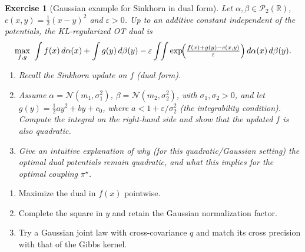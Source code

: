 \documentclass[11pt,a4paper]{article}
\theoremstyle{exostyle}
\newtheorem{exercise}{Exercise}
\begin{document}
\begin{exercise}[Gaussian example for Sinkhorn in dual form]\label{ex:gaussian-sinkhorn}
Let $\alpha,\beta\in\mathcal P_2(\mathbb R)$, $c(x,y)=\frac12(x-y)^2$
and $\varepsilon>0$. Up to an additive constant independent of the
potentials, the KL-regularized OT dual is
\[
\max_{f,g} \ \int f(x)\,d\alpha(x) + \int g(y)\,d\beta(y)
- \varepsilon \int\!\!\int \exp\!\Bigl(\tfrac{f(x)+g(y)-c(x,y)}{\varepsilon}\Bigr)\,d\alpha(x)\,d\beta(y).
\]
\begin{enumerate}[label=\textbf{(\arabic*)}]
  \item Recall the Sinkhorn update on $f$ (dual form).
  \item Assume $\alpha=\mathcal N(m_1,\sigma_1^2)$, $\beta=\mathcal N(m_2,\sigma_2^2)$, with $\sigma_1,\sigma_2>0$, and let $g(y)=\frac12 a y^2+b y+c_0$, where $a<1+\varepsilon/\sigma_2^2$ (the integrability condition). Compute the integral on the right-hand side and show that the updated $f$ is also quadratic.
  \item Give an intuitive explanation of why (for this quadratic/Gaussian setting) the optimal dual potentials remain quadratic, and what this implies for the optimal coupling $\pi^\star$.
\end{enumerate}
\end{exercise}
\begin{hints}
\begin{enumerate}[label=(\arabic*)]\item Maximize the dual in $f(x)$ pointwise.\item Complete the square in $y$ and retain the Gaussian normalization factor.\item Try a Gaussian joint law with cross-covariance $q$ and match its cross precision with that of the Gibbs kernel.\end{enumerate}
\end{hints}
\end{document}
